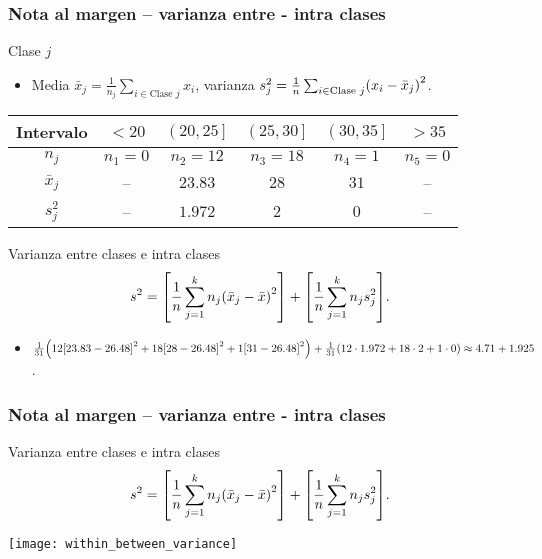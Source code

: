 \documentclass[table]{beamer}
\begin{document}
\begin{frame}
    \frametitle{Nota al margen -- varianza entre - intra clases}
    \begin{block}{Clase $j$}
        \begin{itemize}
            \item Media $\bar{x}_{j} = \frac{1}{n_{j}} \sum_{i \in \text{Clase } j} x_{i}$, varianza $s^{2}_{j} = \frac{1}{n} \sum_{i \in \text{Clase } j} \parens{x_{i} - \bar{x}_{j}}^{2}$.
        \end{itemize}
    \end{block}
    \begin{center}
        \begin{tabular}{c||c|c|c|c|c}
            Intervalo & $< 20$ & $\left ( 20 , 25 \right ]$ & $\left ( 25 , 30 \right ]$ & $\left ( 30 , 35 \right ]$ & $> 35$ \\
            \hline
            $n_{j}$ & $n_{1} = 0$ & $n_{2} = 12$ & $n_{3} = 18$ & $n_{4} = 1$ & $n_{5} = 0$ \\
            \hline
            $\bar{x}_{j}$ & -- & $23.83$ & $28$ & $31$ & -- \\
            $s^{2}_{j}$ & -- & $1.972$ & $2$ & $0$ & -- \\
        \end{tabular}
    \end{center}
    \begin{block}{Varianza entre clases e intra clases}
        \begin{equation*}
            s^{2} = \sparens{\frac{1}{n} \sum_{j = 1}^{k} n_{j} \parens{\bar{x}_{j} - \bar{x}}^{2}} + \sparens{\frac{1}{n} \sum_{j = 1}^{k} n_{j} s^{2}_{j}} .
        \end{equation*}
        \begin{itemize}
            \item $\frac{1}{31} \parens{12 \sparens{23.83 - 26.48}^{2} + 18 \sparens{28 - 26.48}^{2} + 1 \sparens{31 - 26.48}^{2}} + \frac{1}{31} \parens{12 \cdot 1.972 + 18 \cdot 2 + 1 \cdot 0} \approx 4.71 + 1.925$ .
        \end{itemize}
    \end{block}
\end{frame}

\begin{frame}
    \frametitle{Nota al margen -- varianza entre - intra clases}
    \begin{block}{Varianza entre clases e intra clases}
        \begin{equation*}
            s^{2} = \sparens{\frac{1}{n} \sum_{j = 1}^{k} n_{j} \parens{\bar{x}_{j} - \bar{x}}^{2}} + \sparens{\frac{1}{n} \sum_{j = 1}^{k} n_{j} s^{2}_{j}} .
        \end{equation*}
    \end{block}
    \begin{center}
        \texttt{[image: within\_between\_variance]}
    \end{center}
\end{frame}
\end{document}
